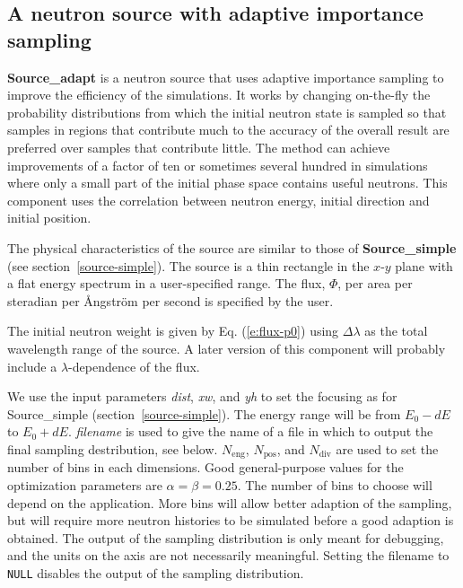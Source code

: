 \subsection*{A neutron source with adaptive importance sampling}
\label{s:Source_adapt}
\label{s:source-adapt}


\textbf{Source\_adapt} is a neutron source that uses adaptive
importance sampling to improve the efficiency of the simulations. It
works by changing on-the-fly the probability distributions from which
the initial neutron state is sampled so that samples in regions that
contribute much to the accuracy of the overall result are preferred over
samples that contribute little. The method can achieve improvements of a
factor of ten or sometimes several hundred in simulations where only a
small part of the initial phase space contains useful neutrons.
This component uses the correlation between neutron energy,
initial direction and initial position.

The physical characteristics of the source are similar to those of
\textbf{Source\_simple} (see section~\ref{source-simple}). The source is a thin
rectangle in the $x$-$y$ plane with a flat energy spectrum in a
user-specified range. The flux, $\Phi$, per area per steradian per
Ångström per second is specified by the user.

The initial neutron weight is given by Eq. (\ref{e:flux-p0}) using
$\Delta\lambda$ as the total wavelength range of the source.
A later version of this component will probably include a
$\lambda$-dependence of the flux.

We use the input parameters \textit{dist}, \textit{xw}, and \textit{yh}
to set the focusing as for Source\_simple (section~\ref{source-simple}).
The energy range will be from $E_0 - dE$ to $E_0 + dE$.
\textit{filename} is used to give the name of a file in which to
output the final sampling destribution, see below.
$N_\textrm{eng}$, $N_\textrm{pos}$, and $N_\textrm{div}$
are used to set the number of bins in each dimensions.
Good general-purpose values for the optimization parameters are
$\alpha = \beta = 0.25$. The number of bins to choose will depend on the
application. More bins will allow better adaption of the sampling, but
will require more neutron histories to be simulated before a good
adaption is obtained. The output of the sampling distribution is only
meant for debugging, and the units on the axis are not necessarily
meaningful. Setting the filename to \verb+NULL+ disables the output of
the sampling distribution.

